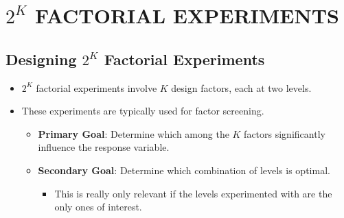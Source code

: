 \chapter{\texorpdfstring{$ 2^K $}{2K} FACTORIAL EXPERIMENTS}
\section{Designing \texorpdfstring{$ 2^K $}{2K} Factorial Experiments}
\begin{itemize}[*]
      \item $ 2^K $ factorial experiments involve $ K $ design factors, each at two levels.
\end{itemize}
\begin{itemize}
      \item These experiments are typically used for factor screening.
            \begin{itemize}[$\rightarrow$]
                  \item \textbf{Primary Goal}: Determine which among the $ K $ factors significantly influence the response variable.
                  \item \textbf{Secondary Goal}: Determine which combination of levels is optimal.
                        \begin{itemize}[$\hookrightarrow$]
                              \item This is really only relevant if the levels experimented with are the only ones of interest.
                        \end{itemize}
            \end{itemize}
\end{itemize}
